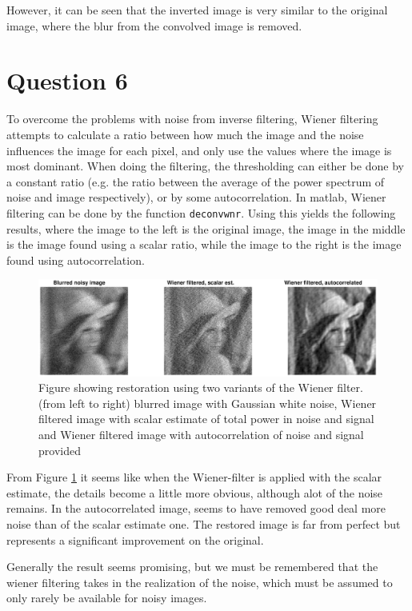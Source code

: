 \documentclass[a4paper]{article}
\begin{document}
However, it can be seen that the inverted image is very similar to the original image, where the blur from the convolved image is removed.
\section*{Question 6}
To overcome the problems with noise from inverse filtering, Wiener filtering attempts to calculate a ratio between how much the image and the noise influences the image for each pixel, and only use the values where the image is most dominant. When doing the filtering, the thresholding can either be done by a constant ratio (e.g. the ratio between the average of the power spectrum of noise and image respectively), or by some autocorrelation. In matlab, Wiener filtering can be done by the function
\texttt{deconvwnr}. Using this yields the following results, where the image to the left is the original image, the image in the middle is the image found using a scalar ratio, while the image to the right is the image found using autocorrelation.
\begin{figure}[H]
  \centering
  \captionsetup{justification=centering}
\includegraphics[width=\textwidth]{q6_1.eps}
\caption{Figure showing restoration using two variants of the Wiener filter. (from left to right) blurred image with Gaussian white noise, Wiener filtered image with scalar estimate of total power in noise and signal and Wiener filtered image with autocorrelation of noise and signal provided}
  \label{q6_1}
\end{figure}
From Figure \ref{q6_1} it seems like when the Wiener-filter is applied with the scalar estimate, the details become a little more obvious, although alot of the noise remains. In the autocorrelated image, seems to have removed good deal more noise than of the scalar estimate one. The restored image is far from perfect but represents a significant improvement on the original.

Generally the result seems promising, but we must be remembered that the wiener filtering takes in the realization of the noise, which must be assumed to only rarely be available for noisy images.
\end{document}
